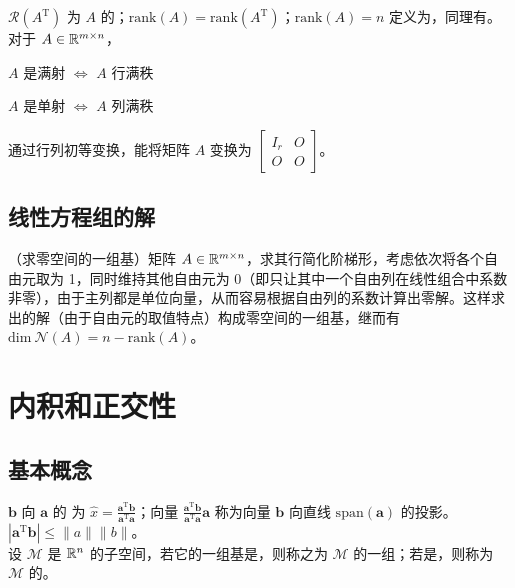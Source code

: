 \documentclass[./main.tex]{subfiles}
\begin{document}
$\mathcal{R}(A^{\mathrm{T}})$ 为 $A$ 的；$\mathrm{rank}(A)=\mathrm{rank}(A^{\mathrm{T}})$；$\mathrm{rank}(A)=n$ 定义为，同理有。\\

对于 $A\in\mathbb{R}^{m\times n}$，
\begin{itemize*}
    \item $A$ 是满射 $\iff$ $A$ 行满秩
    \item $A$ 是单射 $\iff$ $A$ 列满秩
\end{itemize*}

 通过行列初等变换，能将矩阵 $A$ 变换为 $\begin{bmatrix} I_r & O\\ O &O\end{bmatrix}$。

\subsection{线性方程组的解}
（求零空间的一组基）矩阵 $A\in\mathbb{R}^{m\times n}$，求其行简化阶梯形，考虑依次将各个自由元取为 1，同时维持其他自由元为 0（即只让其中一个自由列在线性组合中系数非零），由于主列都是单位向量，从而容易根据自由列的系数计算出零解。这样求出的解（由于自由元的取值特点）构成零空间的一组基，继而有 $\mathrm{dim}\ \mathcal{N}(A)=n-\mathrm{rank}(A)$。

\section{内积和正交性}

\subsection{基本概念}

$\bm{b}$ 向 $\bm{a}$ 的 为 $\hat{x}=\frac{\bm{a}^{\mathrm{T}}\bm{b}}{\bm{a}^{\mathrm{T}}\bm{a}}$；向量 $\frac{\bm{a}^{\mathrm{T}}\bm{b}}{\bm{a}^{\mathrm{T}}\bm{a}}\bm{a}$ 称为向量 $\bm{b}$ 向直线 $\mathrm{span}(\bm{a})$ 的投影。\\

 $|\bm{a}^{\mathrm{T}}\bm{b}|\le \|a\|\|b\|$。\\

设 $\mathcal{M}$ 是 $\mathbb{R}^{n}$ 的子空间，若它的一组基是，则称之为 $\mathcal{M}$ 的一组；若是，则称为 $\mathcal{M}$ 的。\\
\end{document}
